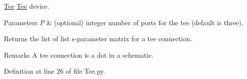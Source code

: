\hyperlink{namespaceSignalIntegrity_1_1Devices_1_1Tee}{Tee} \hyperlink{namespaceSignalIntegrity_1_1Devices_1_1Tee}{Tee} device. 


\begin{DoxyParams}{Parameters}
{\em P} & (optional) integer number of ports for the tee (default is three). \\
\hline
\end{DoxyParams}
\begin{DoxyReturn}{Returns}
the list of list s-\/parameter matrix for a tee connection. 
\end{DoxyReturn}
\begin{DoxyRemark}{Remarks}
A tee connection is a dot in a schematic. 
\end{DoxyRemark}


Definition at line 26 of file Tee.\+py.

